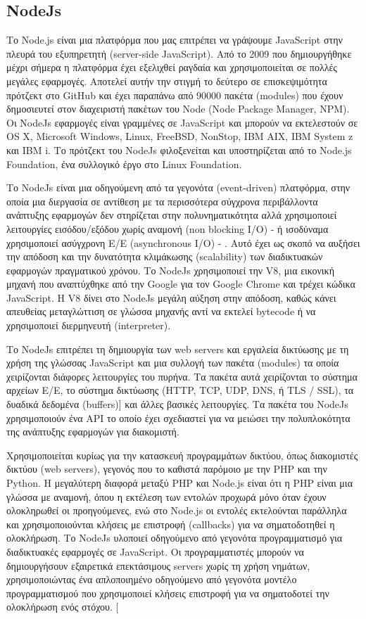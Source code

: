 				
			\cite{Kaufm2009}					
				
		\subsection{NodeJs}
	
		Το Node.js είναι μια πλατφόρμα που μας επιτρέπει να γράψουμε JavaScript στην πλευρά του εξυπηρετητή (server-side JavaScript). Από το 2009 που δημιουργήθηκε μέχρι σήμερα η πλατφόρμα έχει εξελιχθεί ραγδαία και χρησιμοποιείται σε πολλές μεγάλες εφαρμογές. Αποτελεί αυτήν την στιγμή το δεύτερο σε επισκεψιμότητα πρότζεκτ στο GitHub και έχει παραπάνω από 90000 πακέτα (modules) που έχουν δημοσιευτεί στον διαχειριστή πακέτων του Node (Node Package Manager, NPM). Οι NodeJs εφαρμογές είναι γραμμένες σε JavaScript και μπορούν να εκτελεστούν σε OS X, Microsoft Windows, Linux, FreeBSD, NonStop, IBM AIX, IBM System z και IBM i. Το πρότζεκτ του NodeJs φιλοξενείται και υποστηρίζεται από το Node.js Foundation,  ένα συλλογικό έργο στο  Linux Foundation. \cite{Tilkov2010}

		Το NodeJs είναι μια οδηγούμενη από τα γεγονότα (event-driven) πλατφόρμα,  στην οποία μια διεργασία σε αντίθεση με τα περισσότερα σύγχρονα περιβάλλοντα ανάπτυξης εφαρμογών  δεν στηρίζεται στην πολυνηματικότητα αλλά χρησιμοποιεί λειτουργίες εισόδου/εξόδου χωρίς αναμονή (non blocking I/O) - ή ισοδύναμα χρησιμοποιεί ασύγχρονη Ε/Ε (asynchronous I/O) - . Αυτό έχει ως σκοπό να αυξήσει την απόδοση και την δυνατότητα κλιμάκωσης (scalability) των διαδικτυακών εφαρμογών πραγματικού χρόνου. Το NodeJs χρησιμοποιεί την V8, μια εικονική μηχανή που αναπτύχθηκε από την Google για τον Google Chrome και τρέχει κώδικα JavaScript. Η V8 δίνει στο NodeJs μεγάλη αύξηση στην απόδοση, καθώς κάνει απευθείας μεταγλώττιση σε γλώσσα μηχανής αντί να εκτελεί bytecode ή να χρησιμοποιεί διερμηνευτή (interpreter).

	Το NodeJs επιτρέπει τη δημιουργία των web servers και εργαλεία δικτύωσης με τη χρήση της γλώσσας JavaScript και μια συλλογή των πακέτα (modules) τα οποία χειρίζονται διάφορες λειτουργίες του πυρήνα. \cite{node}  Τα πακέτα αυτά χειρίζονται το σύστημα αρχείων Ε/Ε, το σύστημα δικτύωσης (HTTP, TCP, UDP, DNS, ή TLS / SSL), τα δυαδικά δεδομένα (buffers)] και άλλες βασικές λειτουργίες. Τα πακέτα του NodeJs χρησιμοποιούν ένα API το οποίο έχει σχεδιαστεί για να μειώσει την πολυπλοκότητα της ανάπτυξης εφαρμογών για διακομιστή.

	Χρησιμοποιείται κυρίως για την κατασκευή προγραμμάτων δικτύου, όπως διακομιστές δικτύου (web servers), γεγονός που το καθιστά παρόμοιο με την PHP και την Python. Η μεγαλύτερη διαφορά μεταξύ PHP και Node.js είναι ότι η PHP είναι μια γλώσσα με αναμονή, όπου η εκτέλεση των εντολών προχωρά μόνο όταν έχουν ολοκληρωθεί οι προηγούμενες, ενώ στο Node.js  οι εντολές εκτελούνται παράλληλα και χρησιμοποιούνται  κλήσεις με επιστροφή (callbacks) για να σηματοδοτηθεί η ολοκλήρωση. Το NodeJs υλοποιεί οδηγούμενο από γεγονότα προγραμματισμό για διαδικτυακές εφαρμογές σε JavaScript. Οι προγραμματιστές μπορούν να δημιουργήσουν εξαιρετικά επεκτάσιμους servers χωρίς τη χρήση νημάτων, χρησιμοποιώντας ένα απλοποιημένο οδηγούμενο από γεγονότα μοντέλο προγραμματισμού που χρησιμοποιεί κλήσεις επιστροφή για να σηματοδοτεί την ολοκλήρωση ενός στόχου. [\cite{surenda}



